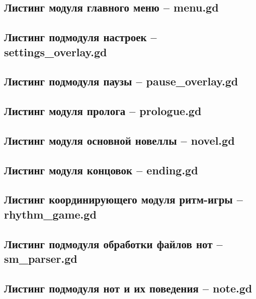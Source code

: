 \documentclass[utf8, russian]{eskdtext}
\numberwithin{equation}{section}
\newcounter{game_cnt}
\begin{document}

\subsection*{Листинг модуля главного меню -- menu.gd}


\subsection*{Листинг подмодуля настроек -- settings\_overlay.gd}


\subsection*{Листинг подмодуля паузы -- pause\_overlay.gd}


\subsection*{Листинг модуля пролога -- prologue.gd}


\subsection*{Листинг модуля основной новеллы -- novel.gd}


\subsection*{Листинг модуля концовок -- ending.gd}


\subsection*{Листинг координирующего модуля ритм-игры -- rhythm\_game.gd}


\subsection*{Листинг подмодуля обработки файлов нот -- sm\_parser.gd}


\subsection*{Листинг подмодуля нот и их поведения -- note.gd}

\end{document}
